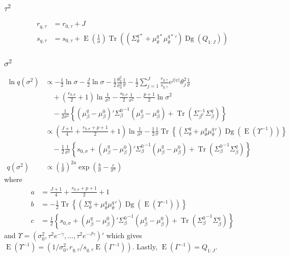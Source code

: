 \documentclass[11pt]{article}
\DeclareMathOperator{\Tr}{Tr}
\newcommand{\opn}{\operatorname}
\begin{document}
\subsubsection{$\tau^{2}$}
  \begin{align*}
    r_{q,\tau} &= r_{0,\tau} + J\\
    s_{q,\tau} &= s_{0,\tau} + \opn{E}\left(\frac{1}{\sigma}\right)\Tr\left(\left(\Sigma_{\theta}^{q*} + \mu_{\theta}^{q*}{\mu_{\theta}^{q*}}'\right)\opn{Dg}\left(Q_{1:J}\right)\right)
  \end{align*}
\subsubsection{$\sigma^{2}$}
  \begin{align*}
    \ln q\left(\sigma^{2}\right) &\propto -\frac{1}{2}\ln \sigma -\frac{J}{2}\ln \sigma -\frac{1}{2}\frac{\theta_{0}^{2}}{\sigma_{0}^{2}}\frac{1}{\sigma} -\frac{1}{2}\sum_{j=1}^{J}\frac{r_{q,\tau}}{s_{q,\tau}}e^{j\left|\psi\right|}\theta_{j}^{2}\frac{1}{\sigma}\\
    &\quad +\left(\frac{r_{0,\sigma}}{2}+1\right)\ln \frac{1}{\sigma^{2}} -\frac{s_{0,\sigma}}{2}\frac{1}{\sigma^{2}} -\frac{p+1}{2}\ln\sigma^{2}\\
    &\quad -\frac{1}{2\sigma^{2}}\left\{\left(\mu_{\beta}^{q}-\mu_{\beta}^{0}\right)'{\Sigma_{\beta}^{0}}^{-1}\left(\mu_{\beta}^{q}-\mu_{\beta}^{0}\right) + \Tr\left(\Sigma_{{\beta}^{0}}^{-1}\Sigma_{\beta}^{q} \right) \right\}\\
    &\propto \left(\frac{J+1}{4} +\frac{r_{0,\sigma}+p+1}{2} + 1\right)\ln \frac{1}{\sigma^{2}} -\frac{1}{2}\frac{1}{\sigma}\Tr\left\{\left(\Sigma_{\theta}^{q}+\mu_{\theta}^{q}{\mu_{\theta}^{q}}'\right)\opn{Dg}\left(\opn{E}\left(\Upsilon^{-1}\right)\right) \right\}\\
    &\quad -\frac{1}{2}\frac{1}{\sigma^{2}}\left\{s_{0,\sigma} + \left(\mu_{\beta}^{q}-\mu_{\beta}^{0}\right)'{\Sigma_{\beta}^{0}}^{-1}\left(\mu_{\beta}^{q}-\mu_{\beta}^{0}\right)  + \Tr\left({\Sigma_{\beta}^{0}}^{-1}\Sigma_{\beta}^{q}\right) \right\}\\
    q\left(\sigma^{2}\right) &\propto \left(\frac{1}{\sigma}\right)^{2a}\exp\left(\frac{b}{\sigma} -\frac{c}{\sigma^{2}}\right)
  \end{align*}
  where
  \begin{align*}
    a &= \frac{J+1}{4} + \frac{r_{0,\sigma}+p+1}{2} + 1\\
    b &= -\frac{1}{2}\Tr\left\{\left(\Sigma_{\theta}^{q}+\mu_{\theta}^{q}{\mu_{\theta}^{q}}'\right)\opn{Dg}\left(\opn{E}\left(\Upsilon^{-1}\right)\right) \right\}\\
    c &= \frac{1}{2}\left\{s_{0,\sigma} + \left(\mu_{\beta}^{q}-\mu_{\beta}^{0}\right)'{\Sigma_{\beta}^{0}}^{-1}\left(\mu_{\beta}^{q}-\mu_{\beta}^{0}\right)+\Tr\left({\Sigma_{\beta}^{0}}^{-1}\Sigma_{\beta}^{q}\right) \right\}
  \end{align*}
and $\Upsilon = \left(\sigma_{0}^{2}, \tau^{2}e^{-\gamma}, \ldots , \tau^{2}e^{-J\gamma} \right)'$ which gives $\opn{E}\left(\Upsilon^{-1}\right)=\left(1/\sigma_{0}^{2}, r_{q,\tau}/s_{q,\tau}\opn{E}\left(\Gamma^{-1}\right)\right)$. Lastly, $\opn{E}\left(\Gamma^{-1}\right)=Q_{1:J}$.
\end{document}
